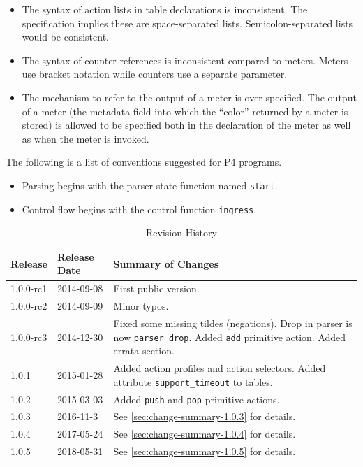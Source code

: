 \documentclass[12pt]{article}
\begin{document}


\begin{itemize}
\item The syntax of action lists in table declarations is inconsistent. The specification implies these are space-separated lists. Semicolon-separated lists would be consistent.
\item The syntax of counter references is inconsistent compared to meters. Meters use bracket notation while counters use a separate parameter.
\item The mechanism to refer to the output of a meter is over-specified. The output of a meter (the metadata field into which the ``color'' returned by a meter is stored) is allowed to be specified both in the declaration of the meter as well as when the meter is invoked.
\end{itemize}



The following is a list of conventions suggested for P4 programs.

\begin{itemize}
\item
Parsing begins with the parser state function named \texttt{start}.
\item
Control flow begins with the control function \texttt{ingress}.
\end{itemize}



\begin{table}[H]
\begin{center}
\begin{tabular}{| l | l | p{} |} \hline
\textbf{Release} &
\textbf{Release Date} &
\textbf{Summary of Changes} \\  \hline
1.0.0-rc1 & 2014-09-08 & First public version. \\  \hline
1.0.0-rc2 & 2014-09-09 & Minor typos. \\  \hline
1.0.0-rc3 & 2014-12-30 & Fixed some missing tildes (negations). Drop in parser is now \texttt{parser_drop}. Added \texttt{add} primitive action. Added errata section. \\  \hline
1.0.1 & 2015-01-28 & Added action profiles and action selectors. Added attribute \texttt{support_timeout} to tables. \\  \hline
1.0.2 & 2015-03-03 & Added \texttt{push} and \texttt{pop} primitive actions. \\  \hline
1.0.3 & 2016-11-3 & See \ref{sec:change-summary-1.0.3} for details. \\ \hline
1.0.4 & 2017-05-24 & See \ref{sec:change-summary-1.0.4} for details. \\ \hline
1.0.5 & 2018-05-31 & See \ref{sec:change-summary-1.0.5} for details. \\ \hline
\end{tabular}
\end{center}
\caption{Revision History}
\label{tab:revhistory}
\end{table}
\end{document}
